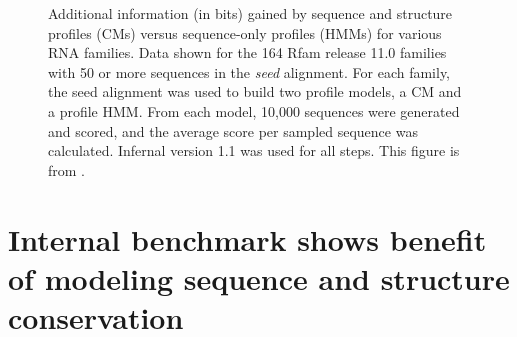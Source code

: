 \documentclass[custom,landscape,final,30pt,plainboxedsections]{sciposter-titleskipsmall}
\begin{document}
\begin{multicols}{3}
\begin{footnotesize}
\begin{figure}
\caption{Additional information (in bits) gained by sequence and
  structure profiles (CMs) versus sequence-only profiles (HMMs) for
  various RNA families.  
  Data shown for the 164 Rfam release 11.0 families
  with 50 or more sequences in the \emph{seed} alignment. For each
  family, the seed alignment was used to build two profile models, a
  CM and a profile HMM. From each model, 10,000 sequences were
  generated and scored, and the average score per sampled sequence was
  calculated. Infernal version 1.1 was used for all steps. This figure
  is from \cite{Nawrocki13b}.
}
\label{fig:avgscores}
\end{figure}
\end{footnotesize}


\columnbreak

\section*{Internal benchmark shows benefit of modeling sequence and
  structure conservation}


\end{multicols}
\end{document}
